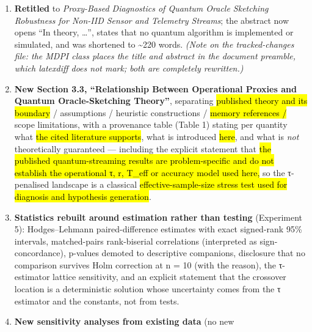 \documentclass[
  11pt,
]{article}
\providecommand{\tightlist}{%
  \setlength{\itemsep}{0pt}\setlength{\parskip}{0pt}}
\providecommand{\DIFadd}[1]{\hl{#1}} %
\providecommand{\DIFdel}[1]{} %
\providecommand{\DIFaddbegin}{} %
\providecommand{\DIFaddend}{} %
\providecommand{\DIFdelbegin}{} %
\providecommand{\DIFdelend}{} %
\providecommand{\DIFaddbegin}{}
\begin{document}
\begin{enumerate}
\def\labelenumi{\arabic{enumi}.}
\tightlist
\item
  \textbf{Retitled} to \emph{Proxy-Based Diagnostics of Quantum Oracle
  Sketching Robustness for Non-IID Sensor and Telemetry Streams}; the
  abstract now opens ``In theory, \ldots{}'', states that no quantum
  algorithm is implemented or simulated, and was shortened to
  \textasciitilde220 words. \emph{(Note on the tracked-changes file: the
  MDPI class places the title and abstract in the document preamble,
  which latexdiff does not mark; both are completely rewritten.)}
\item
  \textbf{New Section 3.3, ``Relationship Between Operational Proxies
  and Quantum Oracle-Sketching Theory''}, separating \DIFdelbegin \DIFdel{established theory
  }\DIFdelend \DIFaddbegin \DIFadd{published theory
  and its boundary }\DIFaddend / assumptions / heuristic constructions / \DIFaddbegin \DIFadd{memory
  references / }\DIFaddend scope limitations, with a provenance table (Table 1)
  stating per quantity what \DIFdelbegin \DIFdel{is inherited}\DIFdelend \DIFaddbegin \DIFadd{the cited literature supports}\DIFaddend , what is
  introduced \DIFaddbegin \DIFadd{here}\DIFaddend , and what is \emph{not} theoretically guaranteed ---
  including the explicit statement that \DIFdelbegin \DIFdel{under the framework's own
  r-only accounting no proxy--baseline crossover exists,
  }\DIFdelend \DIFaddbegin \DIFadd{the published quantum-streaming
  results are problem-specific and do not establish the operational τ,
  r, T\_eff or accuracy model used here, }\DIFaddend so the τ-penalised landscape is
  a classical \DIFdelbegin \DIFdel{effective-sample stress test , not
  the framework's cost model}\DIFdelend \DIFaddbegin \DIFadd{effective-sample-size stress test used for diagnosis and
  hypothesis generation}\DIFaddend .
\item
  \textbf{Statistics rebuilt around estimation rather than testing}
  (Experiment 5): Hodges--Lehmann paired-difference estimates with exact
  signed-rank 95\% intervals, matched-pairs rank-biserial correlations
  (interpreted as sign-concordance), p-values demoted to descriptive
  companions, disclosure that no comparison survives Holm correction at
  n = 10 (with the reason), the τ-estimator lattice sensitivity, and an
  explicit statement that the crossover location is a deterministic
  solution whose uncertainty comes from the τ estimator and the
  constants, not from tests.
\item
  \textbf{New sensitivity analyses from existing data} (no new

\end{enumerate}
\end{document}
